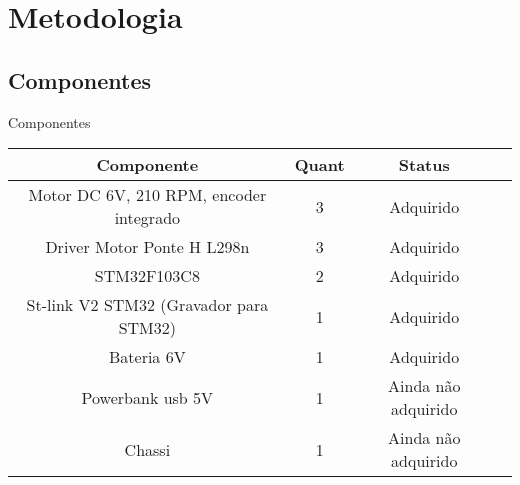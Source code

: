 

\chapter{Metodologia}

\section{Componentes}

\begin{quadro}[htb]
\caption{\label{lista de componentes}Componentes}
 \begin{tabular}{|c|c|c|c|}
	\hline
	\textbf{Componente} & \textbf{Quant} & \textbf{Status} \\ \hline
	Motor DC 6V,  210 RPM, encoder integrado & 3 & Adquirido  \\ \hline
	Driver Motor Ponte H L298n  & 3 & Adquirido  \\ \hline
	STM32F103C8 & 2 & Adquirido   \\ \hline
	St-link V2 STM32 (Gravador para STM32) & 1 & Adquirido   \\ \hline
	Bateria 6V & 1  & Adquirido    \\ \hline
	Powerbank usb 5V & 1 & Ainda não adquirido  \\ \hline
	Chassi & 1 & Ainda não adquirido  \\ \hline
\end{tabular}
\end{quadro}
